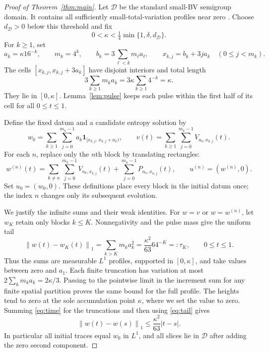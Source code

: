 \documentclass[11pt]{article}
\newcommand{\ind}{\mathbf 1}
\newcommand{\norm}[1]{\left\|#1\right\|}
\begin{document}
\begin{proof}[Proof of Theorem~\ref{thm:main}]
Let $\mathcal D$ be the standard small-BV semigroup domain. It contains all sufficiently small-total-variation profiles near zero \cite[p.~1]{BG}. Choose $d_{\mathcal D}>0$ below this threshold and fix
\[
 0<\kappa<\tfrac14\min\{1,\delta,d_{\mathcal D}\}.
\]
For $k\ge1$, set
\begin{equation}\label{eq:blocks}
 a_k=\kappa16^{-k},\qquad m_k=4^k,\qquad
 b_k=3\sum_{\ell<k}m_\ell a_\ell,\qquad
 x_{k,j}=b_k+3ja_k\quad(0\le j<m_k).
\end{equation}
The cells $[x_{k,j},x_{k,j}+3a_k]$ have disjoint interiors and total length
\[
 3\sum_{k\ge1}m_ka_k
 =3\kappa\sum_{k\ge1}4^{-k}=\kappa.
\]
They lie in $[0,\kappa]$. Lemma~\ref{lem:pulse} keeps each pulse within the first half of its cell for all $0\le t\le1$.

Define the fixed datum and a candidate entropy solution by
\begin{equation}\label{eq:fixed-data}
 w_0=\sum_{k\ge1}\sum_{j=0}^{m_k-1}
          a_k\ind_{[x_{k,j},\,x_{k,j}+a_k)},\qquad
 v(t)=\sum_{k\ge1}\sum_{j=0}^{m_k-1}V_{a_k,x_{k,j}}(t).
\end{equation}
For each $n$, replace only the $n$th block by translating rectangles:
\begin{equation}\label{eq:approximation}
 w^{(n)}(t)=
 \sum_{k\ne n}\sum_{j=0}^{m_k-1}V_{a_k,x_{k,j}}(t)
 +\sum_{j=0}^{m_n-1}P_{a_n,x_{n,j}}(t),
 \qquad u^{(n)}=(w^{(n)},0).
\end{equation}
Set $u_0=(w_0,0)$. These definitions place every block in the initial datum once; the index $n$ changes only its subsequent evolution.

We justify the infinite sums and their weak identities. For $w=v$ or $w=w^{(n)}$, let $w_K$ retain only blocks $k\le K$. Nonnegativity and the pulse mass give the uniform tail
\begin{equation}\label{eq:tail}
 \norm{w(t)-w_K(t)}_1
 =\sum_{k>K}m_ka_k^2
 =\frac{\kappa^2}{63}64^{-K}=:\tau_K,
 \qquad 0\le t\le1.
\end{equation}
Thus the sums are measurable $L^1$ profiles, supported in $[0,\kappa]$, and take values between zero and $a_1$. Each finite truncation has variation at most $2\sum_km_ka_k=2\kappa/3$. Passing to the pointwise limit in the increment sum for any finite spatial partition proves the same bound for the full profile. The heights tend to zero at the sole accumulation point $\kappa$, where we set the value to zero. Summing \eqref{eq:time} for the truncations and then using \eqref{eq:tail} gives
\begin{equation}\label{eq:global-time}
 \norm{w(t)-w(s)}_1\le\frac{\kappa^2}{63}|t-s|.
\end{equation}
In particular all initial traces equal $w_0$ in $L^1$, and all slices lie in $\mathcal D$ after adding the zero second component.


\end{proof}
\end{document}
